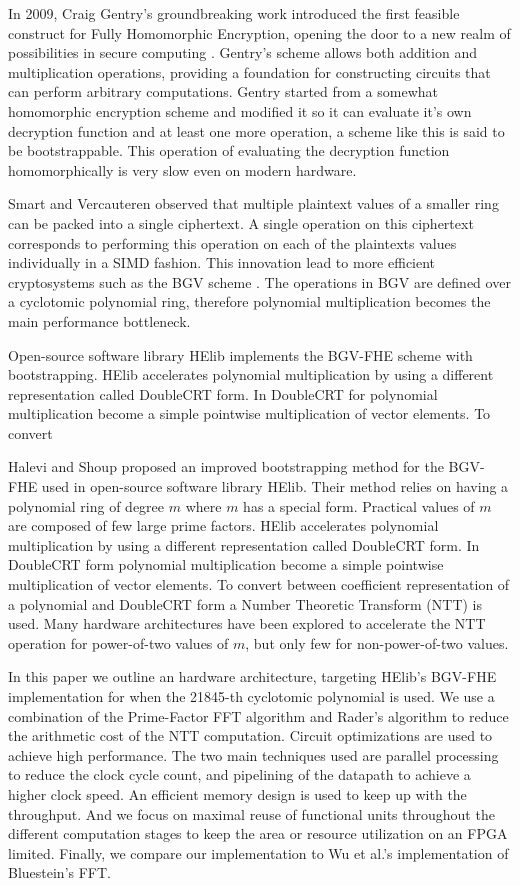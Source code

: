 \documentclass[lettersize,journal]{IEEEtran}
\begin{document}
In 2009, Craig Gentry's groundbreaking work introduced the first feasible construct for Fully Homomorphic Encryption, opening the door to a new realm of possibilities in secure computing \cite{10.1145/1536414.1536440}. Gentry's scheme allows both addition and multiplication operations, providing a foundation for constructing circuits that can perform arbitrary computations. Gentry started from a somewhat homomorphic encryption scheme and modified it so it can evaluate it's own decryption function and at least one more operation, a scheme like this is said to be bootstrappable. This operation of evaluating the decryption function homomorphically is very slow even on modern hardware. \cite{cryptoeprint:2014/873}

Smart and Vercauteren \cite{FHEsimd} observed that multiple plaintext values of a smaller ring can be packed into a single ciphertext. A single operation on this ciphertext corresponds to performing this operation on each of the plaintexts values individually in a SIMD fashion. This innovation lead to more efficient cryptosystems such as the BGV scheme \cite{BGV}. The operations in BGV are defined over a cyclotomic polynomial ring, therefore polynomial multiplication becomes the main performance bottleneck.

Open-source software library HElib\cite{helib} implements the BGV-FHE scheme with bootstrapping. HElib accelerates polynomial multiplication by using a different representation called DoubleCRT form. In DoubleCRT for polynomial multiplication become a simple pointwise multiplication of vector elements. To convert 

Halevi and Shoup \cite{cryptoeprint:2014/873} proposed an improved bootstrapping method for the BGV-FHE used in open-source software library HElib\cite{helib}.   Their method relies on having a polynomial ring of degree $m$ where $m$ has a special form. Practical values of $m$ are composed of few large prime factors. HElib accelerates polynomial multiplication by using a different representation called DoubleCRT form. In DoubleCRT form polynomial multiplication become a simple pointwise multiplication of vector elements. To convert between coefficient representation of a polynomial and DoubleCRT form a Number Theoretic Transform (NTT) is used. Many hardware architectures have been explored to accelerate the NTT operation for power-of-two values of $m$, but only few for non-power-of-two values.

In this paper we outline an hardware architecture, targeting HElib's BGV-FHE implementation for when the 21845-th cyclotomic polynomial is used. We use a combination of the Prime-Factor FFT algorithm and Rader's algorithm to reduce the arithmetic cost of the NTT computation. Circuit optimizations are used to achieve high performance. The two main techniques used are parallel processing to reduce the clock cycle count, and pipelining of the datapath to achieve a higher clock speed. An efficient memory design is used to keep up with the throughput. And we focus on maximal reuse of functional units throughout the different computation stages to keep the area or resource utilization on an FPGA limited. Finally, we compare our implementation to Wu et al.'s \cite{9937536} implementation of Bluestein's FFT.
\end{document}
